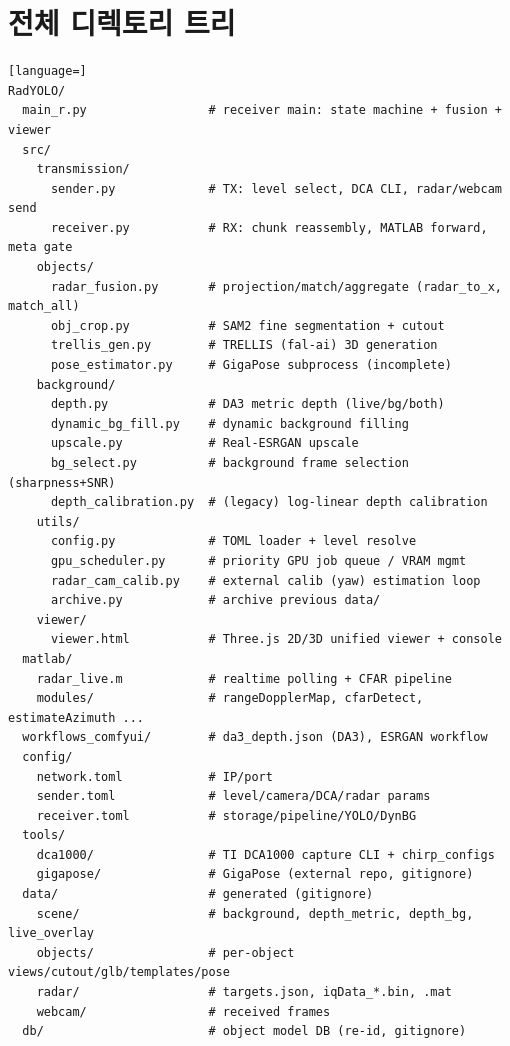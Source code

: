 \chapter{전체 디렉토리 트리}
\begin{lstlisting}[language=]
RadYOLO/
  main_r.py                 # receiver main: state machine + fusion + viewer
  src/
    transmission/
      sender.py             # TX: level select, DCA CLI, radar/webcam send
      receiver.py           # RX: chunk reassembly, MATLAB forward, meta gate
    objects/
      radar_fusion.py       # projection/match/aggregate (radar_to_x, match_all)
      obj_crop.py           # SAM2 fine segmentation + cutout
      trellis_gen.py        # TRELLIS (fal-ai) 3D generation
      pose_estimator.py     # GigaPose subprocess (incomplete)
    background/
      depth.py              # DA3 metric depth (live/bg/both)
      dynamic_bg_fill.py    # dynamic background filling
      upscale.py            # Real-ESRGAN upscale
      bg_select.py          # background frame selection (sharpness+SNR)
      depth_calibration.py  # (legacy) log-linear depth calibration
    utils/
      config.py             # TOML loader + level resolve
      gpu_scheduler.py      # priority GPU job queue / VRAM mgmt
      radar_cam_calib.py    # external calib (yaw) estimation loop
      archive.py            # archive previous data/
    viewer/
      viewer.html           # Three.js 2D/3D unified viewer + console
  matlab/
    radar_live.m            # realtime polling + CFAR pipeline
    modules/                # rangeDopplerMap, cfarDetect, estimateAzimuth ...
  workflows_comfyui/        # da3_depth.json (DA3), ESRGAN workflow
  config/
    network.toml            # IP/port
    sender.toml             # level/camera/DCA/radar params
    receiver.toml           # storage/pipeline/YOLO/DynBG
  tools/
    dca1000/                # TI DCA1000 capture CLI + chirp_configs
    gigapose/               # GigaPose (external repo, gitignore)
  data/                     # generated (gitignore)
    scene/                  # background, depth_metric, depth_bg, live_overlay
    objects/                # per-object views/cutout/glb/templates/pose
    radar/                  # targets.json, iqData_*.bin, .mat
    webcam/                 # received frames
  db/                       # object model DB (re-id, gitignore)
\end{lstlisting}

